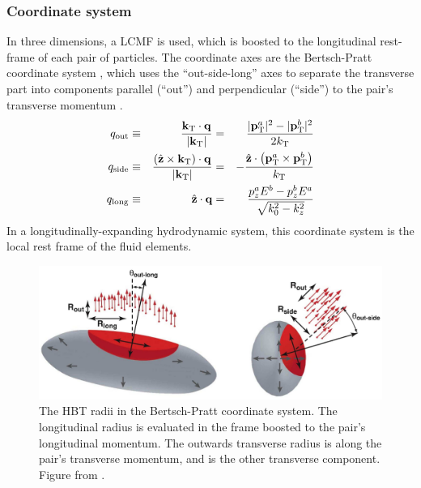 
\subsubsection{Coordinate system}
\label{subsubsec:coordinate}
In three dimensions, a \ac{LCMF} is used, which is boosted to the longitudinal rest-frame of each pair of particles.
The coordinate axes are the Bertsch-Pratt coordinate system \cite{Pratt:1986cc,Bertsch:1989vn,Csorgo:1989kq}, which uses the ``out-side-long'' axes to separate the transverse part into components parallel (``out'') and perpendicular (``side'') to the pair's transverse momentum \kt.
\begin{align}
q_{\mathrm{out}} &\equiv& \frac{\mathbf{k}_{\mathrm{T}} \cdot \mathbf{q}}{\left| \mathbf{k}_{\mathrm{T}} \right|}
&=& \frac{|\mathbf{p}^a_{\mathrm{T}}|^2 - |\mathbf{p}^b_{\mathrm{T}}|^2}{2 k_\mathrm{T}}\\
q_{\mathrm{side}} &\equiv& \frac{(\hat{\mathbf{z}} \times \mathbf{k}_{\mathrm{T}}) \cdot \mathbf{q}}{\left| \mathbf{k}_{\mathrm{T}} \right|} &=& - \frac{\hat{\mathbf{z}} \cdot \left(\mathbf{p}^a_{\mathrm{T}} \times \mathbf{p}^b_{\mathrm{T}}\right)}{k_\mathrm{T}}\\
q_{\mathrm{long}} &\equiv& \hat{\mathbf{z}} \cdot \mathbf{q} &=& \frac{p^a_{z}E^{b} - p^b_{z}E^{a}}{\sqrt{k_{0}^2 - k_{z}^2}}
\end{align}
In a longitudinally-expanding hydrodynamic system, this coordinate system is the local rest frame of the fluid elements.

\begin{figure}[t]
  \includegraphics{hbt_radii_outsidelong.png}
  \caption{The HBT radii in the Bertsch-Pratt coordinate system. The longitudinal radius \Rlong is evaluated in the frame boosted to the pair's longitudinal momentum. The outwards transverse radius \Rout is along the pair's transverse momentum, and \Rside is the other transverse component. Figure from .}
  \label{fig:hbt_outsidelong}
\end{figure}

